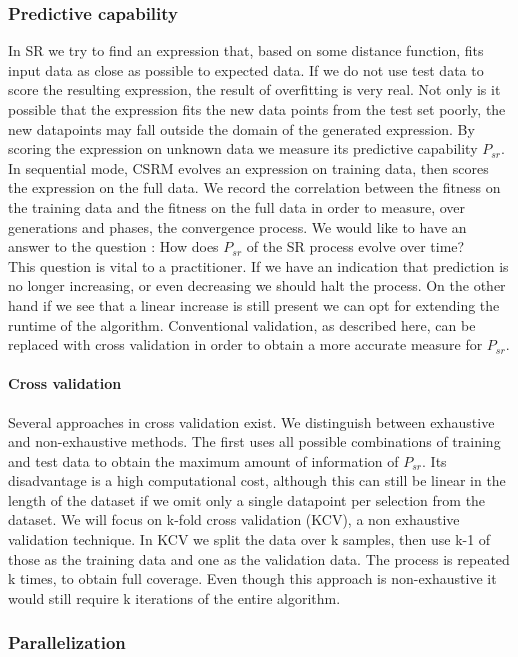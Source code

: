 \subsubsection{Predictive capability}
In SR we try to find an expression that, based on some distance function, fits input data as close as possible to expected data. If we do not use test data to score the resulting expression, the result of overfitting is very real. Not only is it possible that the expression fits the new data points from the test set poorly, the new datapoints may fall outside the domain of the generated expression. By scoring the expression on unknown data we measure its predictive capability $P_{sr}$. In sequential mode, CSRM evolves an expression on training data, then scores the expression on the full data. We record the correlation between the fitness on the training data and the fitness on the full data in order to measure, over generations and phases, the convergence process. We would like to have an answer to the question : How does $P_{sr}$ of the SR process evolve over time?\\
This question is vital to a practitioner. If we have an indication that prediction is no longer increasing, or even decreasing we should halt the process. On the other hand if we see that a linear increase is still present we can opt for extending the runtime of the algorithm. Conventional validation, as described here, can be replaced with cross validation in order to obtain a more accurate measure for $P_{sr}$.

\paragraph{Cross validation}
Several approaches in cross validation exist. We distinguish between exhaustive and non-exhaustive methods. The first uses all possible combinations of training and test data to obtain the maximum amount of information of $P_{sr}$. Its disadvantage is a high computational cost, although this can still be linear in the length of the dataset if we omit only  a single datapoint per selection from the dataset. We will focus on k-fold cross validation (KCV), a non exhaustive validation technique. 
In KCV we split the data over k samples, then use k-1 of those as the training data and one as the validation data. The process is repeated k times, to obtain full coverage. Even though this approach is non-exhaustive it would still require k iterations of the entire algorithm.

\subsubsection{Parallelization}

